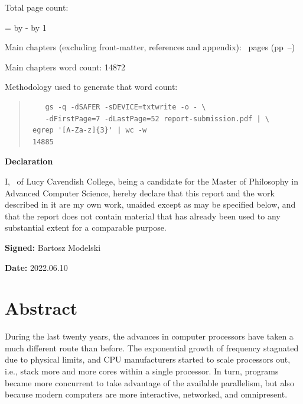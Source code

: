 \documentclass[12pt,a4paper,twoside]{report}
\newif\ifsubmission %
\newcommand{\college}{Lucy Cavendish College}
\newcommand{\course}{Master of Philosophy in Advanced Computer Science}
\begin{document}
\begin{sffamily}
Total page count: \pageref{lastpage}

\makeatletter
\@tempcnta=\relax%
\advance\@tempcnta by -%
\advance\@tempcnta by 1%
\xdef\contentpages{\the\@tempcnta}%
\makeatother

Main chapters (excluding front-matter, references and appendix):
\contentpages~pages
(pp~\pageref{firstcontentpage}--\pageref{lastcontentpage})

Main chapters word count: 14872

Methodology used to generate that word count: 

\begin{quote}
\begin{verbatim}
    gs -q -dSAFER -sDEVICE=txtwrite -o - \
    -dFirstPage=7 -dLastPage=52 report-submission.pdf | \
 egrep '[A-Za-z]{3}' | wc -w
 14885 
\end{verbatim}
\end{quote}

\end{sffamily}

\vspace{\fill}
\onehalfspacing
\ifsubmission\else\makeatletter
\textbf{\Huge Declaration}
\vspace{40pt}

I, \@author\ of \college, being a candidate for the \course, hereby
declare that this report and the work described in it are my own work,
unaided except as may be specified below, and that the report does not
contain material that has already been used to any substantial extent
for a comparable purpose.


\bigskip 
\textbf{Signed:} Bartosz Modelski

\bigskip
\textbf{Date:} 2022.06.10
\vspace{\fill}
\makeatother\fi


\chapter*{Abstract}

During the last twenty years, the advances in computer processors have taken a much different route than before. The exponential growth of frequency stagnated due to physical limits, and CPU manufacturers started to scale processors out, i.e., stack more and more cores within a single processor. In turn, programs became more concurrent to take advantage of the available parallelism, but also because modern computers are more interactive, networked, and omnipresent. 
\end{document}
